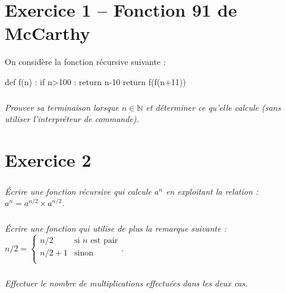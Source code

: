\documentclass[10pt,fleqn]{book} %
\begin{document}

\vspace{10cm}
\pagestyle{fancy}
\thispagestyle{plain}

\setcounter{secnumdepth}{5}
\def\columnseprulecolor{\color{ocre}}
\setlength{\columnseprule}{0.4pt} 
\begin{multicols}{2}

\section*{Exercice 1 -- Fonction 91 de McCarthy}
On considère la fonction récursive suivante : 
\begin{py}
\begin{python}
def f(n) :
    if n>100 : 
        return n-10
    return f(f(n+11))
\end{python}
\end{py}

\subparagraph*{} \textit{Prouver sa terminaison lorsque $n\in\mathbb{N}$ et déterminer ce qu'elle calcule (sans utiliser l'interpréteur de commande).}


\section*{Exercice 2}
\setcounter{subparagraph}{0}
\subparagraph{}
\textit{Écrire une fonction récursive qui calcule $a^n$ en exploitant la relation : $a^n=a^{n/2}\times a^{n/2}$.}
\subparagraph{}
\textit{Écrire une fonction qui utilise de plus la remarque suivante :}
$n/2 = \left\{ 
\begin{array}{ll} 
n/2 & \text{si }n \text{ est pair} \\
n/2+1 & \text{sinon}\\
\end{array}
\right.
$.
\subparagraph{}
\textit{Effectuer le nombre de multiplications effectuées dans les deux cas.}



\end{multicols}
\end{document}
